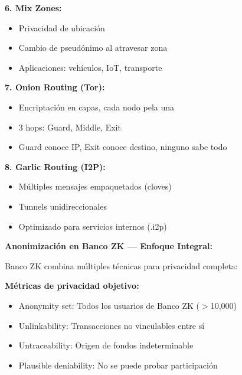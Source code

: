 \documentclass[11pt,a4paper,twoside]{book}
\begin{document}
\begin{keyidea}
\textbf{6. Mix Zones:}
\begin{itemize}
    \item Privacidad de ubicaci\'on
    \item Cambio de pseud\'onimo al atravesar zona
    \item Aplicaciones: veh\'iculos, IoT, transporte
\end{itemize}

\textbf{7. Onion Routing (Tor):}
\begin{itemize}
    \item Encriptaci\'on en capas, cada nodo pela una
    \item 3 hops: Guard, Middle, Exit
    \item Guard conoce IP, Exit conoce destino, ninguno sabe todo
\end{itemize}

\textbf{8. Garlic Routing (I2P):}
\begin{itemize}
    \item M\'ultiples mensajes empaquetados (cloves)
    \item Tunnels unidireccionales
    \item Optimizado para servicios internos (.i2p)
\end{itemize}
\end{keyidea}

\begin{bancozk}
\textbf{Anonimizaci\'on en Banco ZK --- Enfoque Integral:}

Banco ZK combina m\'ultiples t\'ecnicas para privacidad completa:

\begin{center}
\end{center}

\textbf{M\'etricas de privacidad objetivo:}
\begin{itemize}
    \item Anonymity set: Todos los usuarios de Banco ZK ($>$10,000)
    \item Unlinkability: Transacciones no vinculables entre s\'i
    \item Untraceability: Origen de fondos indeterminable
    \item Plausible deniability: No se puede probar participaci\'on
\end{itemize}
\end{bancozk}
\end{document}
